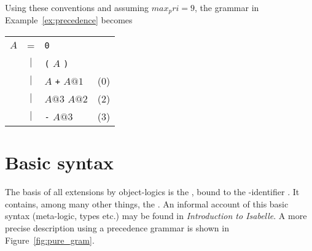 Using these conventions and assuming $max_pri=9$, the grammar in
Example~\ref{ex:precedence} becomes
\begin{center}
\begin{tabular}{rclc}
$A$ & = & {\tt0} & \hspace*{4em} \\
 & $|$ & {\tt(} $A$ {\tt)} \\
 & $|$ & $A$ {\tt+} $A@1$ & (0) \\
 & $|$ & $A@3$ {\tt*} $A@2$ & (2) \\
 & $|$ & {\tt-} $A@3$ & (3)
\end{tabular}
\end{center}



\section{Basic syntax} \label{sec:basic_syntax}

The basis of all extensions by object-logics is the ,
bound to the \ML-identifier . It contains, among many other
things, the . An informal account of this basic syntax
(meta-logic, types etc.) may be found in {\em Introduction to Isabelle}. A
more precise description using a precedence grammar is shown in
Figure~\ref{fig:pure_gram}.

